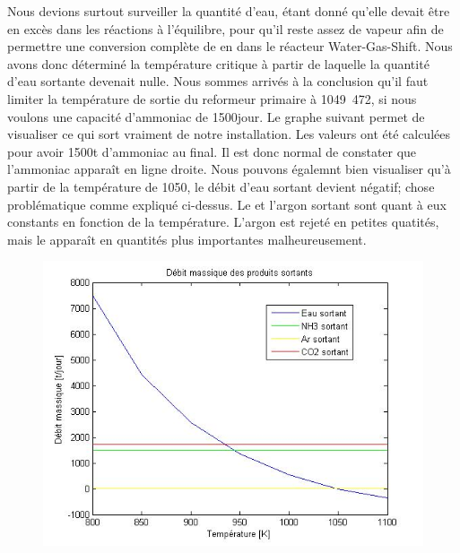 \newpage
Nous devions surtout surveiller la quantité d'eau, étant donné qu'elle devait être en excès dans les réactions à
l'équilibre, pour qu'il reste assez de vapeur afin de permettre une conversion complète de  en  dans le
réacteur Water-Gas-Shift.
Nous avons donc déterminé la température critique à partir de laquelle la quantité d'eau sortante devenait nulle.
Nous sommes arrivés à la conclusion qu'il faut limiter la température de sortie du reformeur primaire à
\unit{1049.472}{\kelvin}, si nous voulons une capacité d'ammoniac de \unit{1500}{\ton\per jour}.
Le graphe suivant permet de visualiser ce qui sort vraiment de notre installation. Les valeurs ont été calculées pour
avoir 1500t d'ammoniac au final. Il est donc normal de constater que l'ammoniac apparaît en ligne droite.
Nous pouvons égalemnt bien visualiser qu'à partir de la température de \unit{1050}{\kelvin}, le débit d'eau sortant devient
négatif; chose problématique comme expliqué ci-dessus.
Le  et l'argon sortant sont quant à eux constants en fonction de la température. L'argon est rejeté en petites quatités, mais le 
apparaît en quantités plus importantes malheureusement.
\begin{figure}[ht!]
\centering
\includegraphics[scale=0.6]{produits.jpg}
\label{produits_sortants}
\end{figure}
